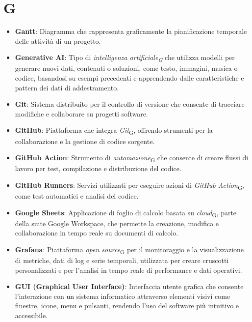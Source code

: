 \section*{G}  
\begin{itemize}
    \item \textbf{Gantt}: Diagramma che rappresenta graficamente la pianificazione temporale delle attività di un progetto.
    \item \textbf{Generative AI}: Tipo di \textit{intelligenza artificiale\textsubscript{G}} che utilizza modelli per generare nuovi dati, contenuti o soluzioni, come testo, immagini, musica o codice, basandosi su esempi precedenti e apprendendo dalle caratteristiche e pattern dei dati di addestramento.
    \item \textbf{Git}: Sistema distribuito per il controllo di versione che consente di tracciare modifiche e collaborare su progetti software.
    \item \textbf{GitHub}: Piattaforma che integra \textit{Git}\textsubscript{G}, offrendo strumenti per la collaborazione e la gestione di codice sorgente.
    \item \textbf{GitHub Action}: Strumento di \textit{automazione}\textsubscript{G} che consente di creare flussi di lavoro per test, compilazione e distribuzione del codice.
    \item \textbf{GitHub Runners}: Servizi utilizzati per eseguire azioni di \textit{GitHub Action}\textsubscript{G}, come test automatici e analisi del codice.
    \item \textbf{Google Sheets}: Applicazione di foglio di calcolo basata su \textit{cloud}\textsubscript{G}, parte della suite Google Workspace, che permette la creazione, modifica e collaborazione in tempo reale su documenti di calcolo.
    \item \textbf{Grafana}: Piattaforma \textit{open source}\textsubscript{G} per il monitoraggio e la visualizzazione di metriche, dati di log e serie temporali, utilizzata per creare cruscotti personalizzati e per l'analisi in tempo reale di performance e dati operativi.
    \item \textbf{GUI (Graphical User Interface)}: Interfaccia utente grafica che consente l'interazione con un sistema informatico attraverso elementi visivi come finestre, icone, menu e pulsanti, rendendo l'uso del software più intuitivo e accessibile.

\end{itemize}
